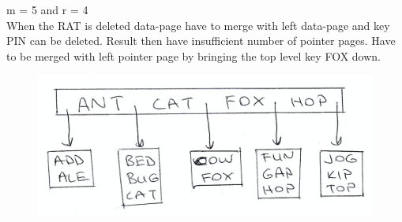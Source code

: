 \documentclass[12pt]{article}
\begin{document}
\begin{enumerate}
    m = 5 and r = 4\\
    When the RAT is deleted data-page have to merge with left data-page and key PIN can be deleted. Result then have insufficient number of pointer pages. Have to be merged with left pointer page by bringing the top level key FOX down.
    \begin{figure}[H] \label{fig:deleterat}
        \centering
        \includegraphics[width=\textwidth]{img/deleterat.png}
    \end{figure}

    \end{enumerate}
\end{document}
